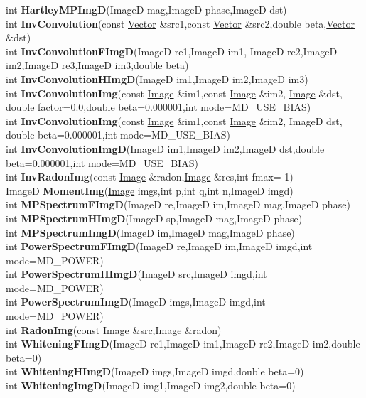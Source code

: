 \documentclass[10pt,titlepage]{article}
\def\functionlistentry#1#2#3#4#5#6{\noindent #1 {\bf #2}(#3) \dotfill #6\\}
\begin{document}
{{\functionlistentry{int}{HartleyMPImgD}{ImageD mag,ImageD phase,ImageD dst}{1209}{signalTrafo}{}
\functionlistentry{int}{InvConvolution}{const \hyperlink{Vector}{Vector} \&src1,const \hyperlink{Vector}{Vector} \&src2,double beta,\hyperlink{Vector}{Vector} \&dst}{1217}{signalTrafo}{}
\functionlistentry{int}{InvConvolutionFImgD}{ImageD re1,ImageD im1, ImageD re2,ImageD im2,ImageD re3,ImageD im3,double beta}{1219}{signalTrafo}{}
\functionlistentry{int}{InvConvolutionHImgD}{ImageD im1,ImageD im2,ImageD im3}{1220}{signalTrafo}{}
\functionlistentry{int}{InvConvolutionImg}{const \hyperlink{Image}{Image} \&im1,const \hyperlink{Image}{Image} \&im2, \hyperlink{Image}{Image} \&dst, double factor=0.0,double beta=0.000001,int mode=MD\_USE\_BIAS}{1221}{signalTrafo}{}
\functionlistentry{int}{InvConvolutionImg}{const \hyperlink{Image}{Image} \&im1,const \hyperlink{Image}{Image} \&im2, ImageD dst, double beta=0.000001,int mode=MD\_USE\_BIAS}{1222}{signalTrafo}{}
\functionlistentry{int}{InvConvolutionImgD}{ImageD im1,ImageD im2,ImageD dst,double beta=0.000001,int mode=MD\_USE\_BIAS}{1218}{signalTrafo}{}
\functionlistentry{int}{InvRadonImg}{const \hyperlink{Image}{Image} \&radon,\hyperlink{Image}{Image} \&res,int fmax=-1}{1232}{signalTrafo}{}
\functionlistentry{ImageD}{MomentImg}{\hyperlink{Image}{Image} imgs,int p,int q,int n,ImageD imgd}{1230}{signalTrafo}{}
\functionlistentry{int}{MPSpectrumFImgD}{ImageD re,ImageD im,ImageD mag,ImageD phase}{1205}{signalTrafo}{}
\functionlistentry{int}{MPSpectrumHImgD}{ImageD sp,ImageD mag,ImageD phase}{1206}{signalTrafo}{}
\functionlistentry{int}{MPSpectrumImgD}{ImageD im,ImageD mag,ImageD phase}{1207}{signalTrafo}{}
\functionlistentry{int}{PowerSpectrumFImgD}{ImageD re,ImageD im,ImageD imgd,int mode=MD\_POWER}{1202}{signalTrafo}{}
\functionlistentry{int}{PowerSpectrumHImgD}{ImageD src,ImageD imgd,int mode=MD\_POWER}{1203}{signalTrafo}{}
\functionlistentry{int}{PowerSpectrumImgD}{ImageD imgs,ImageD imgd,int mode=MD\_POWER}{1204}{signalTrafo}{}
\functionlistentry{int}{RadonImg}{const \hyperlink{Image}{Image} \&src,\hyperlink{Image}{Image} \&radon}{1231}{signalTrafo}{}
\functionlistentry{int}{WhiteningFImgD}{ImageD re1,ImageD im1,ImageD re2,ImageD im2,double beta=0}{1227}{signalTrafo}{}
\functionlistentry{int}{WhiteningHImgD}{ImageD imgs,ImageD imgd,double beta=0}{1228}{signalTrafo}{}
\functionlistentry{int}{WhiteningImgD}{ImageD img1,ImageD img2,double beta=0}{1226}{signalTrafo}{}

}}
\end{document}
